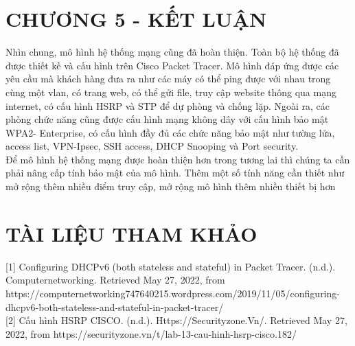 \documentclass[a4paper, 12pt]{article}
\begin{document}
\section*{CHƯƠNG 5 - KẾT LUẬN}
\hspace*{0.25cm}Nhìn chung, mô hình hệ thống mạng cũng đã hoàn thiện. Toàn bộ hệ thống đã được thiết kế và cấu hình trên Cisco Packet Tracer. Mô hình đáp ứng được các yêu cầu mà khách hàng đưa ra như các máy có thể ping được với nhau trong cùng một vlan, có trang web, có thể gửi file, truy cập website thông qua mạng internet, có cấu hình HSRP và STP để dự phòng và chống lặp. Ngoài ra, các phòng chức năng cũng được cấu hình mạng không dây với cấu hình bảo mật WPA2- Enterprise, có cấu hình đầy đủ các chức năng bảo mật như tường lửa, access list, VPN-Ipsec, SSH access, DHCP Snooping và Port security.\\
\hspace*{1cm}Để mô hình hệ thống mạng được hoàn thiện hơn trong tương lai thì chúng ta cần phải nâng cấp tính bảo mật của mô hình. Thêm một số tính năng cần thiết như mở rộng thêm nhiều điểm truy cập, mở rộng mô hình thêm nhiều thiết bị hơn
\cleardoublepage

\section*{TÀI LIỆU THAM KHẢO}
\hspace*{0.25cm}[1] Configuring DHCPv6 (both stateless and stateful) in Packet Tracer. (n.d.). Computernetworking. Retrieved May 27, 2022, from \\https://computernetworking747640215.wordpress.com/2019/11/05/configuring-dhcpv6-both-stateless-and-stateful-in-packet-tracer/\\
\hspace*{1cm}[2] Cấu hình HSRP CISCO. (n.d.). Https://Securityzone.Vn/. Retrieved May 27, 2022, from https://securityzone.vn/t/lab-13-cau-hinh-hsrp-cisco.182/\\

\cleardoublepage
\end{document}
